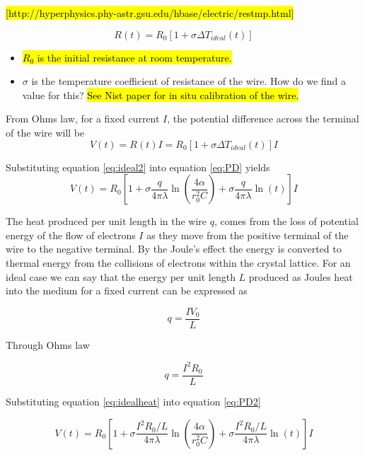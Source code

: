 \documentclass{article}
\begin{document}
\hl{[http://hyperphysics.phy-astr.gsu.edu/hbase/electric/restmp.html]}
	
	\begin{equation} \label{Resistance}
	R(t) = R_0 \left[ 1 + \sigma \Delta T_{ideal}(t) \right]
	\end{equation}


 	\begin{itemize}
 		\item[] \hl{$R_0$ is the initial resistance at room temperature.}
 		\item[] $\sigma$ is the temperature coefficient of resistance of the wire. How do we find a value for this? \hl{See Nist paper for in situ calibration of the wire.}
 	\end{itemize}

From Ohms law, for a fixed current $I$, the potential difference across the terminal of the wire will be
	\begin{equation} \label{eq:PD}
	V(t) = R(t)I = R_0 \left[ 1 + \sigma \Delta T_{ideal}(t) \right] I
	\end{equation}

Substituting equation \ref{eq:ideal2} into equation \ref{eq:PD} yields
	\begin{equation} \label{eq:PD2}
	V(t) = R_0 \left[ 1 + \sigma \frac{q}{4 \pi \lambda} \ln \left( \frac{4 \alpha }		{r^2_0 C}\right) + \sigma \frac{q}{4 \pi \lambda} \ln \left( t \right) \right] I
	\end{equation}

The heat produced per unit length in the wire $q$, comes from the loss of potential energy of the flow of electrons $I$ as they move from the positive terminal of the wire to the negative terminal. By the Joule's effect the energy is converted to thermal energy from the collisions of electrons within the crystal lattice.  
For an ideal case we can say that the energy per unit length $L$ produced as Joules heat into the medium for a fixed current  can be expressed as

$$q = \frac{IV_0}{L}$$

Through Ohms law 

	\begin{equation} \label{eq:idealheat}
	q = \frac{I^2R_0}{L}
	\end{equation}
	
\newpage

Substituting equation \ref{eq:idealheat} into equation \ref{eq:PD2}

$$V(t) = R_0 \left[ 1 + \sigma \frac{I^2R_0/L}{4 \pi \lambda} \ln \left( \frac{4 \alpha } {r^2_0 C}\right) + \sigma \frac{I^2R_0/L}{4 \pi \lambda} \ln \left( t \right) \right] I$$
	
\end{document}
